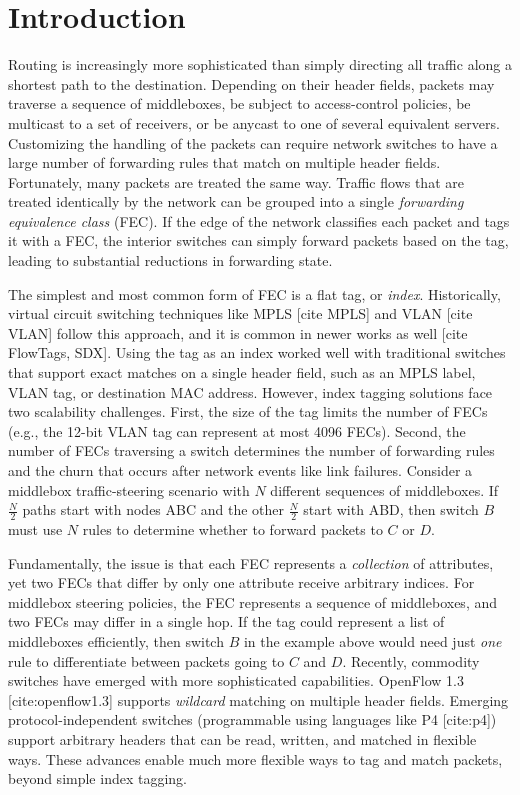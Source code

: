 \section{Introduction}
\label{sec:intro}
Routing is increasingly more sophisticated than simply directing all traffic along a shortest path to the destination.  Depending on their header fields, packets may traverse a sequence of middleboxes, be subject to access-control policies, be multicast to a set of receivers, or be anycast to one of several equivalent servers.  Customizing the handling of the packets can require network switches to have a large number of forwarding rules that match on multiple header fields.  Fortunately, many packets are treated the same way.  Traffic flows that are treated identically by the network can be grouped into a single \emph{forwarding equivalence class} (FEC). If the edge of the network classifies each packet and tags it with a FEC, the interior switches can simply forward packets based on the tag, leading to substantial reductions in forwarding state.

The simplest and most common form of FEC is a flat tag, or \emph{index}. Historically, virtual circuit switching techniques like MPLS [cite MPLS] and VLAN [cite VLAN] follow this approach, and it is common in newer works as well [cite FlowTags, SDX].  Using the tag as an index worked well with traditional switches that support exact matches on a single header field, such as an MPLS label, VLAN tag, or destination MAC address.  However, index tagging solutions face two scalability challenges.  First, the size of the tag limits the number of FECs (e.g., the 12-bit VLAN tag can represent at most 4096 FECs).  Second, the number of FECs traversing a switch determines the number of forwarding rules and the churn that occurs after network events like link failures.  Consider a middlebox traffic-steering scenario with $N$ different sequences of middleboxes.  If $\frac{N}{2}$ paths start with nodes ABC and the other $\frac{N}{2}$ start with ABD, then switch $B$ must use $N$ rules to determine whether to forward packets to $C$ or $D$.

Fundamentally, the issue is that each FEC represents a \emph{collection} of attributes, yet two FECs that differ by only one attribute receive arbitrary indices. For middlebox steering policies, the FEC represents a sequence of middleboxes, and two FECs may differ in a single hop.  If the tag could represent a list of middleboxes efficiently, then switch $B$ in the example above would need just \emph{one} rule to differentiate between packets going to $C$ and $D$.
Recently, commodity switches have emerged with more sophisticated capabilities.  OpenFlow 1.3 [cite:openflow1.3] supports \emph{wildcard} matching on multiple header fields. Emerging protocol-independent switches (programmable using languages like P4 [cite:p4]) support arbitrary headers that can be read, written, and matched in flexible ways.  These advances enable much more flexible ways to tag and match packets, beyond simple index tagging. 


